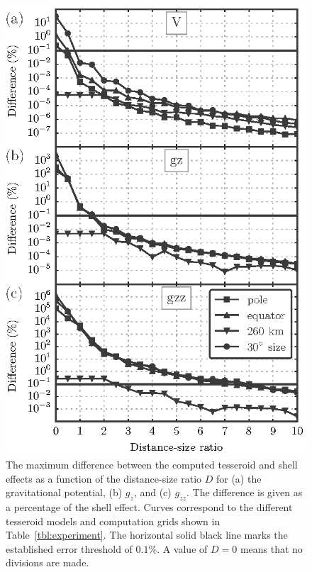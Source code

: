 \begin{figure}
    \centering
    \includegraphics{figures/paper-tesseroids/distance-size-curves}
    \caption{
        The maximum difference between the computed tesseroid and shell effects
        as a function of the distance-size ratio $D$
        for (a) the gravitational potential, (b) $g_z$, and (c) $g_{zz}$.
        The difference is given as a percentage of the shell effect.
        Curves correspond to the different tesseroid models and computation
        grids shown in Table~\ref{tbl:experiment}.
        The horizontal solid black line marks the established error threshold
        of $0.1\%$.
        A value of $D=0$ means that no divisions are made.
    }
    \label{fig:p2-dist-size-curves}
\end{figure}

